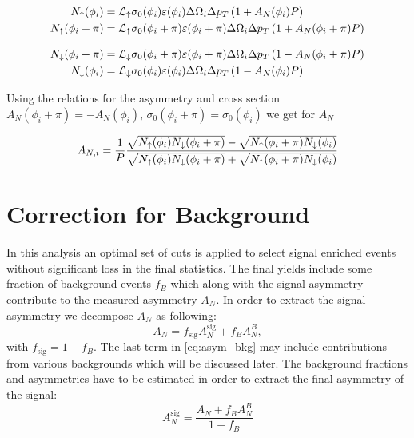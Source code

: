 \documentclass[12pt]{article}
\begin{document}
\begin{align}
N_\uparrow(\phi_i)       &= {\cal L_\uparrow}
   \sigma_{0}(\phi_i) \varepsilon(\phi_i)    \Delta\Omega_i \Delta p_T \left( 1 + A_{N}(\phi_i) P \right) \\
%
N_\uparrow(\phi_i+\pi)       &= {\cal L_\uparrow}
   \sigma_{0}(\phi_i+\pi) \varepsilon(\phi_i+\pi)    \Delta\Omega_i \Delta p_T \left( 1 + A_{N}(\phi_i+\pi) P \right)
\end{align}


\begin{align}
N_\downarrow(\phi_i+\pi) &= {\cal L_\downarrow}
   \sigma_{0}(\phi_i+\pi) \varepsilon(\phi_i+\pi) \Delta\Omega_i \Delta p_T \left( 1 - A_{N}(\phi_i+\pi) P \right) \\
%
N_\downarrow(\phi_i) &= {\cal L_\downarrow}
   \sigma_{0}(\phi_i) \varepsilon(\phi_i) \Delta\Omega_i \Delta p_T \left( 1 - A_{N}(\phi_i) P \right)
\end{align}


Using the relations for the asymmetry and cross section $A_{N}(\phi_i+\pi) =
-A_{N}(\phi_i)$, $\sigma_0(\phi_i+\pi) = \sigma_0(\phi_i)$ we get for $A_N$


\begin{align}
A_{N, i} = \frac{1}{P} \frac{%
\sqrt{N_{\uparrow}(\phi_i)N_{\downarrow}(\phi_i+\pi)} -
\sqrt{N_{\uparrow}(\phi_i+\pi)N_{\downarrow}(\phi_i)}
}{%
\sqrt{N_{\uparrow}(\phi_i)N_{\downarrow}(\phi_i+\pi)} +
\sqrt{N_{\uparrow}(\phi_i+\pi)N_{\downarrow}(\phi_i)}
}
\label{eq:asym_sqrt}
\end{align}



\section{Correction for Background}

In this analysis an optimal set of cuts is applied to select signal enriched
events without significant loss in the final statistics. The final yields
include some fraction of background events $f_B$ which along with the signal
asymmetry contribute to the measured asymmetry $A_N$. In order to extract the
signal asymmetry we decompose $A_N$ as following:
%
\begin{equation}
A_N = f_\text{sig} A^\text{sig}_N + f_B A^B_N,
\label{eq:asym_bkg}
\end{equation}
%
with $f_\text{sig} = 1 - f_B$. The last term in \eqref{eq:asym_bkg} may include
contributions from various backgrounds which will be discussed later. The
background fractions and asymmetries have to be estimated in order to extract
the final asymmetry of the signal:
%
\begin{equation}
A^\text{sig}_N = \frac{A_N + f_B A^B_N}{1 - f_B}
\label{eq_bkg_corr}
\end{equation}
\end{document}
